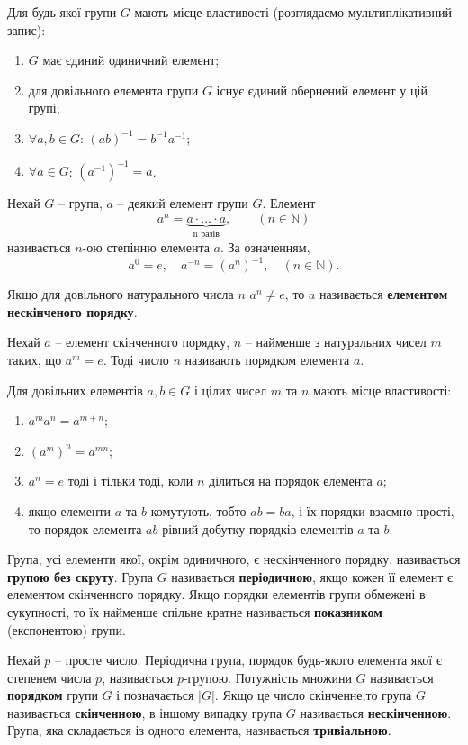 Для будь-якої групи $G$ мають місце властивості (розглядаємо мультиплікативний запис):

\begin{enumerate} [noitemsep,partopsep=0pt,topsep=0pt,parsep=0pt]
\item $G$ має єдиний одиничний елемент;
\item для довільного елемента групи $G$ існує єдиний обернений елемент у цій групі;
\item $\forall a,b \in G$: $(ab)^{-1}=b^{-1} a^{-1}$;
\item $\forall a \in G$: $(a^{-1})^{-1} = a$.
\end{enumerate}

Нехай $G$ -- група, $a$ -- деякий елемент групи $G$. Елемент
\[
a^n = \underbrace{a\cdot \ldots \cdot a}_{\text{n разів}}, \qquad (n \in \mathbb{N})
\]
називається $n$-ою степінню елемента $a$. За означенням, 
\[
a^0 = e, \quad a^{-n} = (a^n)^{-1}, \quad (n \in \mathbb{N}).
\]

Якщо для довільного натурального числа $n$ $a^n \neq e$, то $a$ називається \textbf{елементом нескінченого порядку}.

Нехай $a$ -- елемент скінченного порядку, $n$ -- найменше з натуральних чисел $m$ таких, що $a^m = e$. Тоді число $n$ називають порядком елемента $a$.

Для довільних елементів $a,b \in G$ і цілих чисел $m$ та $n$ мають місце властивості:

\begin{enumerate}[noitemsep,partopsep=0pt,topsep=0pt,parsep=0pt]
\item $a^m a^n = a^{m+n}$;
\item $(a^m)^n = a^{mn}$;
\item $a^n = e$ тоді і тільки тоді, коли $n$ ділиться на порядок елемента $a$;
\item якщо елементи $a$ та $b$ комутують, тобто $ab=ba$, і їх порядки взаємно прості, то порядок елемента $ab$ рівний добутку порядків елементів $a$ та $b$.
\end{enumerate} 

Група, усі елементи якої, окрім одиничного, є нескінченного порядку, називається  \textbf{групою без скруту}. Група $G$ називається \textbf{періодичною}, якщо кожен її елемент є елементом скінченного порядку. Якщо порядки елементів групи обмежені в сукупності, то їх найменше спільне кратне називається \textbf{показником} (експонентою) групи.

Нехай $p$ -- просте число. Періодична група, порядок будь-якого елемента якої є степенем числа $p$, називається $p$-групою. Потужність множини $G$ називається \textbf{порядком} групи $G$ і позначається $|G|$. Якщо це число скінченне,то група $G$ називається \textbf{скінченною}, в іншому випадку група $G$ називається \textbf{нескінченною}. Група, яка складається із одного елемента, називається \textbf{тривіальною}.

